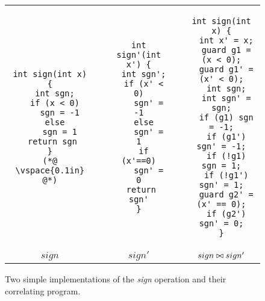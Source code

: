 \begin{figure}
\centering
\begin{tabular}{ccccc}
\begin{lstlisting}
int sign(int x) {
  int sgn;
  if (x < 0)
    sgn = -1
  else
    sgn = 1
 return sgn
}
(*@ \vspace{0.1in} @*)
\end{lstlisting}
&
\hspace{0.35in}
&
\begin{lstlisting}
int sign'(int x') {
  int sgn';
  if (x' < 0)
    sgn' = -1
  else
    sgn' = 1
  if (x'==0)
    sgn' = 0
 return sgn'
}
\end{lstlisting}
&
\hspace{0.35in}
&
\begin{lstlisting}
int sign(int x) {
  int x' = x;
  guard g1 = (x < 0);
  guard g1' = (x' < 0);
  int sgn;
  int sgn' = sgn;
  if (g1) sgn = -1;
  if (g1') sgn' = -1;
  if (!g1) sgn = 1;
  if (!g1') sgn' = 1;
  guard g2' = (x' == 0);
  if (g2') sgn' = 0;
}
\end{lstlisting}
\\
$sign$
&
&
$sign'$
&
&
$sign \bowtie sign'$
\end{tabular}
\caption{Two simple implementations of the \emph{sign} operation and their correlating program.}
\end{figure}
